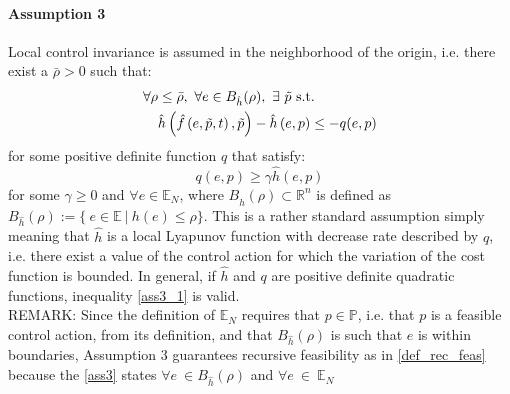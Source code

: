 \paragraph{Assumption 3} Local control invariance is assumed in the neighborhood of the origin, i.e. there exist a $\bar{\rho} > 0$ such that:
\begin{equation}
	\begin{split}
		\forall \rho &\leq \bar{\rho},\ \forall e \in B_{\hat{h}}(\rho),\ \exists\ \tilde{p}\ 	 \textnormal{s.t.} \\
		&\hat{h}\left(\hat{f}\left(e,\tilde{p},t\right),\tilde{p}\right)-\hat{h}\left(e,p\right) \leq -q(e,p) 
		\label{ass3}
	\end{split}
\end{equation}
for some positive definite function $q$ that satisfy:
\begin{equation}
	q(e,p) \ge \gamma \hat{h}(e,p)
	\label{ass3_1} 
\end{equation}
for some $\gamma \geq 0$ and $\forall e \in \mathbb{E}_N$,
where $B_{\hat{h}}(\rho) \subset \mathbb{R}^n$ is defined as $B_{\hat{h}}(\rho) := \lbrace\ e \in \mathbb{E}\ |\ h(e) \leq \rho \rbrace$. This is a rather standard assumption simply meaning that $\hat{h}$ is a local Lyapunov function with decrease rate described by $q$, i.e. there exist a value of the control action for which the variation of the cost function is bounded. In general, if $\hat{h}$ and $q$ are positive definite quadratic functions, inequality \ref{ass3_1} is valid.\\

{REMARK:  } Since the definition of $\mathbb{E}_N$ requires that $p \in \mathbb{P}$, i.e. that $p$ is a feasible control action, from its definition, and that $B_{\hat{h}}(\rho)$ is such that $e$ is within boundaries, Assumption 3 guarantees recursive feasibility as in \ref{def_rec_feas} because the \ref{ass3} states $\forall e\ \in B_{\hat{h}}(\rho)$ and $\forall e\ \in\ \mathbb{E}_N$

